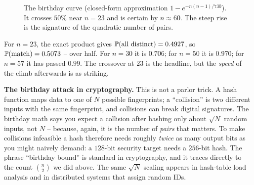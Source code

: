 \begin{figure}[H]
\centering
{}
\caption{The birthday curve (closed-form approximation $1 - e^{-n(n-1)/730}$). It crosses
$50\%$ near $n=23$ and is certain by $n \approx 60$. The steep rise is the
signature of the quadratic number of pairs.}
\label{ch2:fig-birthday}
\end{figure}

\begin{example}
\label{ch2:ex-birthday-numbers}
For $n=23$, the exact product gives $\P(\text{all distinct}) = 0.4927$, so
$\P(\text{match}) = 0.5073$ -- over half. For $n=30$ it is $0.706$; for $n=50$ it is
$0.970$; for $n=57$ it has passed $0.99$. The crossover at $23$ is the headline, but the
\emph{speed} of the climb afterwards is as striking.
\end{example}

\begin{applicationbox}
\textbf{The birthday attack in cryptography.} This is not a parlor trick. A hash function
maps data to one of $N$ possible fingerprints; a ``collision'' is two different inputs with
the same fingerprint, and collisions can break digital signatures. The birthday math says
you expect a collision after hashing only about $\sqrt{N}$ random inputs, not $N$ -- because,
again, it is the number of \emph{pairs} that matters. To make collisions infeasible a hash
therefore needs roughly \emph{twice} as many output bits as you might naively demand: a
$128$-bit security target needs a $256$-bit hash. The phrase ``birthday bound'' is standard
in cryptography, and it traces directly to the count $\binom{n}{2}$ we did above. The same
$\sqrt{N}$ scaling appears in hash-table load analysis and in distributed systems that
assign random IDs.
\end{applicationbox}

